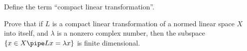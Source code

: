 \begin{alist}
\item Define the term ``compact linear transformation''.
\item Prove that if $L$ is a compact linear transformation of a normed
linear space $X$ into itself, and $\lambda$ is a nonzero complex
number, then the subspace $\{x\in X \pipe Lx=\lambda x\}$ is finite
dimensional.
\end{alist}
